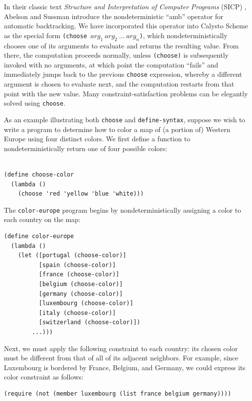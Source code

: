 \documentclass[acmsmall,screen,authorversion]{acmart}
\begin{document}
\noindent
In their classic text \emph{Structure and Interpretation of Computer Programs}
(SICP) \cite{SICP}, Abelson and Sussman introduce the nondeterministic ``amb''
operator for automatic backtracking.  We have incorporated this operator into
Calysto Scheme as the special form
\texttt{(choose~$\mathit{arg}_1~\mathit{arg}_2~\ldots~\mathit{arg}_n$)}, which
nondeterministically chooses one of its arguments to evaluate and returns the
resulting value.  From there, the computation proceeds normally, unless
\texttt{(choose)} is subsequently invoked with no arguments, at which point the
computation ``fails'' and immediately jumps back to the previous
\texttt{choose} expression, whereby a different argument is chosen to evaluate
next, and the computation restarts from that point with the new value.  Many
constraint-satisfaction problems can be elegantly solved using \texttt{choose}.

As an example illustrating both \texttt{choose} and
\texttt{define-syntax}, suppose we wish to write a program to determine how to
color a map of (a portion of) Western Europe using four distinct colors.  We
first define a function to nondeterministically return one of four possible
colors:\\\\

{\small
\begin{verbatim}
(define choose-color
  (lambda ()
    (choose 'red 'yellow 'blue 'white)))
\end{verbatim}
}

\noindent
The \texttt{color-europe} program begins by nondeterministically assigning a
color to each country on the map:

{\small
\begin{verbatim}
(define color-europe
  (lambda ()
    (let ([portugal (choose-color)]
          [spain (choose-color)]
          [france (choose-color)]
          [belgium (choose-color)]
          [germany (choose-color)]
          [luxembourg (choose-color)]
          [italy (choose-color)]
          [switzerland (choose-color)])
        ...)))
\end{verbatim}
}

\noindent
Next, we must apply the following constraint to each country: its chosen color
must be different from that of all of its adjacent neighbors.  For example,
since Luxembourg is bordered by France, Belgium, and Germany, we could express
its color constraint as follows:

{\small
\begin{verbatim}
(require (not (member luxembourg (list france belgium germany))))
\end{verbatim}
}
\end{document}
